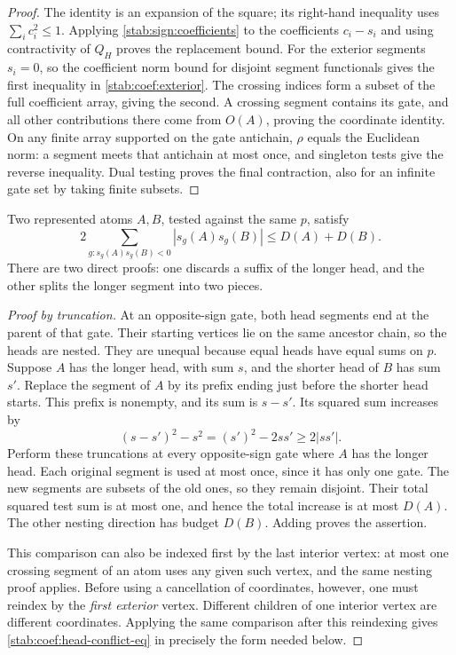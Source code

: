 \begin{proof}
The identity is an expansion of the square; its right-hand inequality
uses $\sum_i c_i^2\le1$. Applying
\eqref{stab:sign:coefficients} to the coefficients $c_i-s_i$ and
using contractivity of $Q_H$ proves the replacement bound.
For the exterior segments $s_i=0$, so the
coefficient norm bound for disjoint segment functionals gives the first
inequality in \eqref{stab:coef:exterior}. The crossing indices form a
subset of the full coefficient array, giving the second. A crossing
segment contains its gate, and all other contributions there come from
$O(A)$, proving the coordinate identity. On any finite array supported
on the gate antichain, $\rho$ equals the Euclidean norm: a segment
meets that antichain at most once, and singleton tests give the reverse
inequality. Dual testing proves the final contraction, also for an
infinite gate set by taking finite subsets.
\end{proof}

\begin{lemma}\label{stab:coef:head-conflict}
Two represented atoms $A,B$, tested against the same $p$, satisfy
\begin{equation}\label{stab:coef:head-conflict-eq}
 2\sum_{g:s_g(A)s_g(B)<0}|s_g(A)s_g(B)|\le D(A)+D(B).
\end{equation}
There are two direct proofs: one discards a suffix of the longer head,
and the other splits the longer segment into two pieces.
\end{lemma}

\begin{proof}[Proof by truncation]
At an opposite-sign gate, both head segments end at the parent of that
gate. Their starting vertices lie on the same ancestor chain, so the
heads are nested. They are unequal because equal heads have equal
sums on $p$. Suppose $A$ has the longer head, with sum $s$, and the
shorter head of $B$ has sum $s'$. Replace the segment of $A$ by its
prefix ending just before the shorter head starts. This prefix is
nonempty, and its sum is $s-s'$. Its squared sum increases by
\[
 (s-s')^2-s^2=(s')^2-2ss'\ge2|ss'|.
\]
Perform these truncations at every opposite-sign gate where $A$ has
the longer head. Each original segment is used at most once, since it
has only one gate. The new segments are subsets of the old ones, so
they remain disjoint. Their total squared test sum is at most one,
and hence the total increase is at most $D(A)$. The other nesting
direction has budget $D(B)$. Adding proves the assertion.

This comparison can also be indexed first by the last interior vertex:
at most one crossing segment of an atom uses any given such vertex,
and the same nesting proof applies. Before using a cancellation of
coordinates, however, one must reindex by the \emph{first exterior}
vertex. Different children of one interior vertex are different
coordinates. Applying the same comparison after this reindexing gives
\eqref{stab:coef:head-conflict-eq} in precisely the form needed below.
\end{proof}

